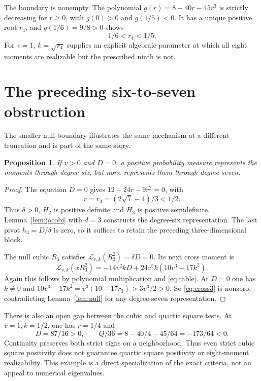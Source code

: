 \documentclass[11pt]{article}
\newtheorem{proposition}[theorem]{Proposition}
\newcommand{\Lk}{\mathcal L_{v,k}}
\begin{document}
The boundary is nonempty. The polynomial
$g(r)=8-40r-45r^3$ is strictly decreasing for $r\geq0$,
with $g(0)>0$ and $g(1/5)<0$. It has a unique positive
root $r_4$, and $g(1/6)=9/8>0$ shows
\begin{equation}\label{eq:r4}
 1/6<r_4<1/5.
\end{equation}
For $v=1$, $k=\sqrt{r_4}$ supplies an explicit algebraic
parameter at which all eight moments are realizable but
the prescribed ninth is not.

\section{The preceding six-to-seven obstruction}
The smaller null boundary illustrates the same mechanism
at a different truncation and is part of the same story.

\begin{proposition}\label{prop:sixseven}
If $v>0$ and $D=0$, a positive probability measure
represents the moments through degree six, but none
represents them through degree seven.
\end{proposition}
\begin{proof}
The equation $D=0$ gives $12-24r-9r^2=0$, with
\begin{equation}\label{eq:r3}
 r=r_3=(2\sqrt7-4)/3<1/2.
\end{equation}
Thus $\delta>0$, $H_2$ is positive definite and $H_3$
is positive semidefinite. Lemma~\ref{lem:jacobi} with
$d=3$ constructs the degree-six representation.
The last pivot $h_3=D/\delta$ is zero, so it suffices
to retain the preceding three-dimensional block.

The null cubic $R_3$ satisfies $\Lk(R_3^2)=\delta D=0$.
Its next cross moment is
\begin{equation}\label{eq:cross3}
 \Lk(xR_3^2)=-14v^2kD+24v^5k(10v^3-17k^2).
\end{equation}
Again this follows by polynomial multiplication and
\eqref{eq:table}. At $D=0$ one has $k\ne0$ and
$10v^3-17k^2=v^3(10-17r_3)>3v^3/2>0$.
So \eqref{eq:cross3} is nonzero, contradicting
Lemma~\ref{lem:null} for any degree-seven representation.
\end{proof}

There is also an open gap between the cubic and quartic
square tests. At $v=1,k=1/2$, one has $r=1/4$ and
\[
 D=87/16>0,\qquad
 Q/36=8-40/4-45/64=-173/64<0.
\]
Continuity preserves both strict signs on a neighborhood.
Thus even strict cubic square positivity does not
guarantee quartic square positivity or eight-moment
realizability. This example is a direct specialization
of the exact criteria, not an appeal to numerical eigenvalues.
\end{document}
